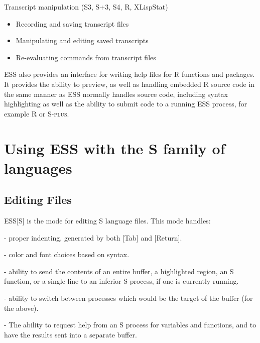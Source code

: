 \documentclass{article}
\newcommand*{\Splus}{\textsc{S-plus}}
\begin{document}
Transcript manipulation (S3, S+3, S4, R, XLispStat)
\begin{itemize}
\item Recording and saving transcript files
\item Manipulating and editing saved transcripts
\item Re-evaluating commands from transcript files
\end{itemize}

ESS also provides an interface for writing help files for R functions
and packages.    It provides the ability to preview, as well as
handling embedded R source code in the same manner as ESS normally
handles source code, including syntax highlighting as well as the
ability to submit code to a running ESS process, for example R or
\Splus. 


\section{Using ESS with the S family of languages}
\label{sec:S}

\subsection{Editing Files}
\label{sec:S:edit}


ESS[S] is the mode for editing S language files.  This mode handles:

- proper indenting, generated by both [Tab] and [Return].

- color and font choices based on syntax.

- ability to send the contents of an entire buffer, a highlighted
  region, an S function, or a single line to an inferior S process, if
  one is currently running.

- ability to switch between processes which would be the target of the 
  buffer (for the above).

- The ability to request help from an S process for variables and
  functions, and to have the results sent into a separate buffer.
\end{document}
